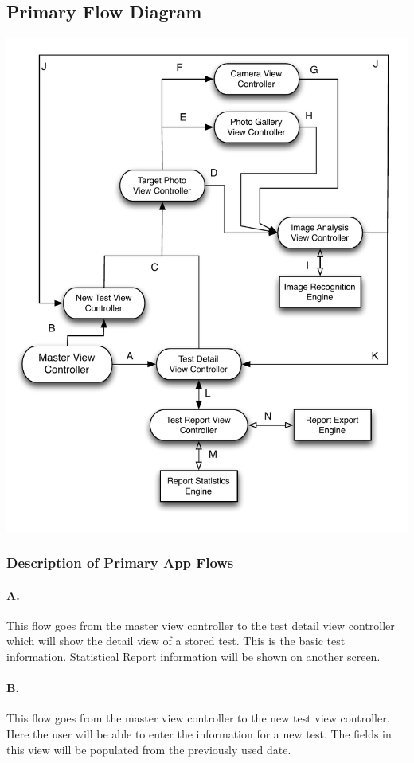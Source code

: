 \subsection{Primary Flow Diagram}
\includegraphics[width=.91\textwidth]{PrimaryFlowDiagram.pdf}

\subsubsection{Description of Primary App Flows}
\paragraph{A.} This flow goes from the master view controller to the test detail view controller which will show the detail view of a stored test. This is the basic test information. Statistical Report information will be shown on another screen.
\paragraph{B.} This flow goes from the master view controller to the new test view controller. Here the user will be able to enter the information for a new test. The fields in this view will be populated from the previously used date.
